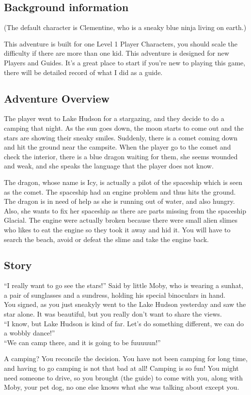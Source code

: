 \documentclass[a4paper,12pt]{article}
\begin{document}
\subsection{Background information}

(The default character is Clementine, who is a sneaky blue ninja living on earth.)

This adventure is built for one Level 1 Player Characters, you should scale the difficulty if there are more than one kid. This adventure is designed for new Players and Guides. It’s a great place to start if you’re
new to playing this game, there will be detailed record of what I did as a guide.

\subsection{Adventure Overview}

The player went to Lake Hudson for a stargazing, and they decide to do a camping that night. As the sun goes down, the moon starts to come out and the stars are showing their sneaky smiles. Suddenly, there is a comet coming down and hit the ground near the campsite. When the player go to the comet and check the interior, there is a blue dragon waiting for them, she seems wounded and weak, and she speaks the language that the player does not know.

The dragon, whose name is Icy, is actually a pilot of the spaceship which is seen as the comet. The spaceship had an engine problem and thus hits the ground. The dragon is in need of help as she is running out of water, and also hungry. Also, she wants to fix her spaceship as there are parts missing from the spaceship Glacial. The engine were actually broken because there were small alien slimes who likes to eat the engine so they took it away and hid it. You will have to search the beach, avoid or defeat the slime and take the engine back.

\subsection{Story}
``I really want to go see the stars!'' Said by little Moby, who is wearing a sunhat, a pair of sunglasses and a sundress, holding his special binoculars in hand. \\You signed, as you just sneakyly went to the Lake Hudson yesterday and saw the star alone. It was beautiful, but you really don't want to share the views. \\``I know, but Lake Hudson is kind of far. Let's do something different, we can do a wobbly dance!'' \\``We can camp there, and it is going to be fuuuuun!''

A camping? You reconcile the decision. You have not been camping for long time, and having to go camping is not that bad at all! Camping is so fun! You might need someone to drive, so you brought (the guide) to come with you, along with Moby, your pet dog, no one else knows what she was talking about except you.
\end{document}
